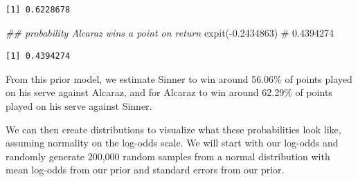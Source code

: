 \documentclass[
  letterpaper,
  DIV=11,
  numbers=noendperiod]{scrartcl}
\newenvironment{Shaded}{\begin{snugshade}}{\end{snugshade}}
\newcommand{\CommentTok}[1]{\textcolor[rgb]{0.37,0.37,0.37}{#1}}
\newcommand{\DocumentationTok}[1]{\textcolor[rgb]{0.37,0.37,0.37}{\textit{#1}}}
\newcommand{\FloatTok}[1]{\textcolor[rgb]{0.68,0.00,0.00}{#1}}
\newcommand{\FunctionTok}[1]{\textcolor[rgb]{0.28,0.35,0.67}{#1}}
\newcommand{\NormalTok}[1]{\textcolor[rgb]{0.00,0.23,0.31}{#1}}
\newcommand{\SpecialCharTok}[1]{\textcolor[rgb]{0.37,0.37,0.37}{#1}}
\begin{document}
\begin{verbatim}
[1] 0.6228678
\end{verbatim}

\begin{Shaded}
\begin{Highlighting}[]
\DocumentationTok{\#\# probability Alcaraz wins a point on return}
\FunctionTok{expit}\NormalTok{(}\SpecialCharTok{{-}}\FloatTok{0.2434863}\NormalTok{) }\CommentTok{\# 0.4394274}
\end{Highlighting}
\end{Shaded}

\begin{verbatim}
[1] 0.4394274
\end{verbatim}

\linespread{2}

From this prior model, we estimate Sinner to win around 56.06\% of
points played on his serve against Alcaraz, and for Alcaraz to win
around 62.29\% of points played on his serve against Sinner.

We can then create distributions to visualize what these probabilities
look like, assuming normality on the log-odds scale. We will start with
our log-odds and randomly generate 200,000 random samples from a normal
distribution with mean log-odds from our prior and standard errors from
our prior.

\linespread{0.9}
\end{document}
